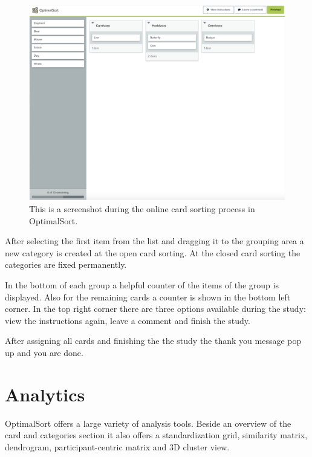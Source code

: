 \begin{figure}[tp] 
\centering
\includegraphics[keepaspectratio,width=\linewidth,height=\halfh]{images/optimalsort-sorting.png}
\caption[OptimalSort Card Sorting] { This is a screenshot during the online card
sorting process in OptimalSort.
 }
\label{fig:OptimalSort2}
\end{figure}

After selecting the first item from the list and dragging it to the
grouping area a new category is created at the open card sorting. At
the closed card sorting the categories are fixed permanently.

In the bottom of each group a helpful counter of the items of the
group is displayed. Also for the remaining cards a counter is shown in
the bottom left corner. In the top right corner there are three
options available during the study: view the instructions again, leave
a comment and finish the study.

After assigning all cards and finishing the the study the thank you
message pop up and you are done.




\section{Analytics}

OptimalSort offers a large variety of analysis tools. Beside an
overview of the card and categories section it also offers a
standardization grid, similarity matrix, dendrogram,
participant-centric matrix and 3D cluster view.

